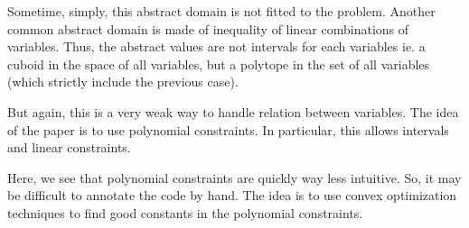 \documentclass[a4paper, twoside, 10pt]{article}
\begin{document}
Sometime, simply, this abstract domain is not fitted to the problem. Another common abstract domain is made of inequality of linear combinations of variables. Thus, the abstract values are not intervals for each variables ie. a cuboid in the space of all variables, but a polytope in the set of all variables (which strictly include the previous case).

But again, this is a very weak way to handle relation between variables. The idea of the paper is to use polynomial constraints. In particular, this allows intervals and linear constraints.

Here, we see that polynomial constraints are quickly way less intuitive. So, it may be difficult to annotate the code by hand. The idea is to use convex optimization techniques to find good constants in the polynomial constraints.

%
%
%
%
%
%
%
%
\end{document}
